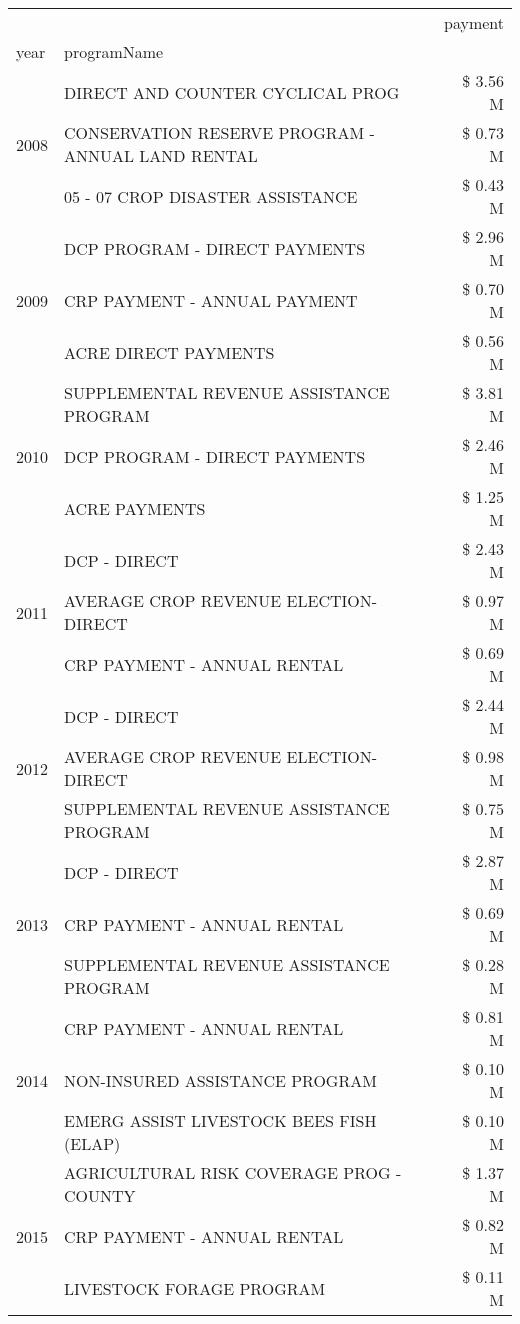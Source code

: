 \begin{tabular}{llr}
\toprule
 &  & payment \\
year & programName &  \\
\midrule
\multirow[t]{3}{*}{2008} & DIRECT AND COUNTER CYCLICAL PROG & \$ 3.56 M \\
 & CONSERVATION RESERVE PROGRAM - ANNUAL LAND RENTAL & \$ 0.73 M \\
 & 05 - 07 CROP DISASTER ASSISTANCE & \$ 0.43 M \\
\cline{1-3}
\multirow[t]{3}{*}{2009} & DCP PROGRAM - DIRECT PAYMENTS & \$ 2.96 M \\
 & CRP PAYMENT - ANNUAL PAYMENT & \$ 0.70 M \\
 & ACRE DIRECT PAYMENTS & \$ 0.56 M \\
\cline{1-3}
\multirow[t]{3}{*}{2010} & SUPPLEMENTAL REVENUE ASSISTANCE PROGRAM & \$ 3.81 M \\
 & DCP PROGRAM - DIRECT PAYMENTS & \$ 2.46 M \\
 & ACRE PAYMENTS & \$ 1.25 M \\
\cline{1-3}
\multirow[t]{3}{*}{2011} & DCP - DIRECT & \$ 2.43 M \\
 & AVERAGE CROP REVENUE ELECTION-DIRECT & \$ 0.97 M \\
 & CRP PAYMENT - ANNUAL RENTAL & \$ 0.69 M \\
\cline{1-3}
\multirow[t]{3}{*}{2012} & DCP - DIRECT & \$ 2.44 M \\
 & AVERAGE CROP REVENUE ELECTION-DIRECT & \$ 0.98 M \\
 & SUPPLEMENTAL REVENUE ASSISTANCE PROGRAM & \$ 0.75 M \\
\cline{1-3}
\multirow[t]{3}{*}{2013} & DCP - DIRECT & \$ 2.87 M \\
 & CRP PAYMENT - ANNUAL RENTAL & \$ 0.69 M \\
 & SUPPLEMENTAL REVENUE ASSISTANCE PROGRAM & \$ 0.28 M \\
\cline{1-3}
\multirow[t]{3}{*}{2014} & CRP PAYMENT - ANNUAL RENTAL & \$ 0.81 M \\
 & NON-INSURED ASSISTANCE PROGRAM & \$ 0.10 M \\
 & EMERG ASSIST LIVESTOCK BEES FISH (ELAP) & \$ 0.10 M \\
\cline{1-3}
\multirow[t]{3}{*}{2015} & AGRICULTURAL RISK COVERAGE PROG - COUNTY & \$ 1.37 M \\
 & CRP PAYMENT - ANNUAL RENTAL & \$ 0.82 M \\
 & LIVESTOCK FORAGE PROGRAM & \$ 0.11 M \\
\cline{1-3}

\end{tabular}
